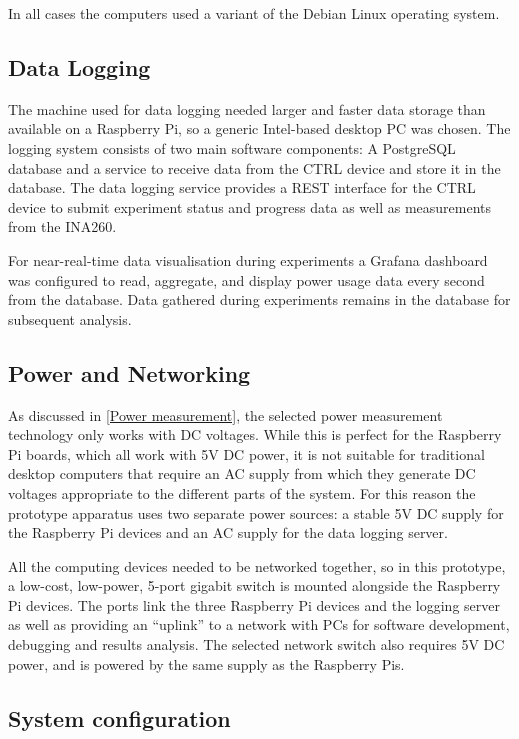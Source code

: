 In all cases the computers used a variant of the Debian Linux operating system.

\subsection{Data Logging}

The machine used for data logging needed larger and faster data storage than available on a Raspberry Pi, so a generic Intel-based desktop PC was chosen. The logging system consists of two main software components: A PostgreSQL database and a service to receive data from the CTRL device and store it in the database. The data logging service provides a REST \citep{Fielding2000} interface for the CTRL device to submit experiment status and progress data as well as measurements from the INA260. 

For near-real-time data visualisation during experiments a Grafana dashboard \citep{Grafana} was configured to read, aggregate, and display power usage data every second from the database. Data gathered during experiments remains in the database for subsequent analysis.

\subsection{Power and Networking}

As discussed in \autoref{Power measurement}, the selected power measurement technology only works with DC voltages. While this is perfect for the Raspberry Pi boards, which all work with 5V DC power, it is not suitable for traditional desktop computers that require an AC supply from which they generate DC voltages appropriate to the different parts of the system. For this reason the prototype apparatus uses two separate power sources: a stable 5V DC supply for the Raspberry Pi devices and an AC supply for the data logging server.

All the computing devices needed to be networked together, so in this prototype, a low-cost, low-power, 5-port gigabit switch is mounted alongside the Raspberry Pi devices. The ports link the three Raspberry Pi devices and the logging server as well as providing an \enquote{uplink} to a network with PCs for software development, debugging and results analysis. The selected network switch also requires 5V DC power, and is powered by the same supply as the Raspberry Pis.

\subsection{System configuration}

